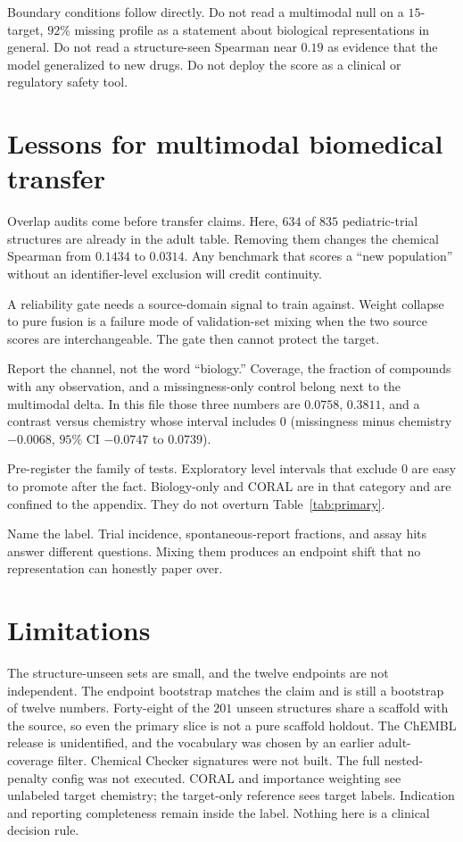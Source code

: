 \documentclass{article}
\begin{document}
Boundary conditions follow directly.
Do not read a multimodal null on a $15$-target, $92\%$ missing profile as a statement about biological representations in general.
Do not read a structure-seen Spearman near $0.19$ as evidence that the model generalized to new drugs.
Do not deploy the score as a clinical or regulatory safety tool.

\section{Lessons for multimodal biomedical transfer}
\label{sec:lessons}

Overlap audits come before transfer claims.
Here, $634$ of $835$ pediatric-trial structures are already in the adult table.
Removing them changes the chemical Spearman from $0.1434$ to $0.0314$.
Any benchmark that scores a ``new population'' without an identifier-level exclusion will credit continuity.

A reliability gate needs a source-domain signal to train against.
Weight collapse to pure fusion is a failure mode of validation-set mixing when the two source scores are interchangeable.
The gate then cannot protect the target.

Report the channel, not the word ``biology.''
Coverage, the fraction of compounds with any observation, and a missingness-only control belong next to the multimodal delta.
In this file those three numbers are $0.0758$, $0.3811$, and a contrast versus chemistry whose interval includes $0$ (missingness minus chemistry $-0.0068$, $95\%$ CI $-0.0747$ to $0.0739$).

Pre-register the family of tests.
Exploratory level intervals that exclude $0$ are easy to promote after the fact.
Biology-only and CORAL are in that category and are confined to the appendix.
They do not overturn Table~\ref{tab:primary}.

Name the label.
Trial incidence, spontaneous-report fractions, and assay hits answer different questions.
Mixing them produces an endpoint shift that no representation can honestly paper over.

\section{Limitations}
\label{sec:limits}

The structure-unseen sets are small, and the twelve endpoints are not independent.
The endpoint bootstrap matches the claim and is still a bootstrap of twelve numbers.
Forty-eight of the $201$ unseen structures share a scaffold with the source, so even the primary slice is not a pure scaffold holdout.
The ChEMBL release is unidentified, and the vocabulary was chosen by an earlier adult-coverage filter.
Chemical Checker signatures were not built.
The full nested-penalty config was not executed.
CORAL and importance weighting see unlabeled target chemistry; the target-only reference sees target labels.
Indication and reporting completeness remain inside the label.
Nothing here is a clinical decision rule.
\end{document}
